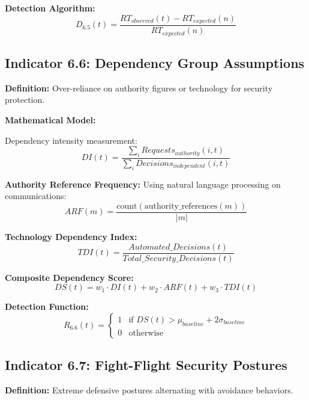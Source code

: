 \documentclass[11pt,a4paper]{article}
\begin{document}
\textbf{Detection Algorithm:}
\begin{equation}
D_{6.5}(t) = \frac{RT_{observed}(t) - RT_{expected}(n)}{RT_{expected}(n)}
\end{equation}

\subsection{Indicator 6.6: Dependency Group Assumptions}

\textbf{Definition:} Over-reliance on authority figures or technology for security protection.

\textbf{Mathematical Model:}

Dependency intensity measurement:
\begin{equation}
DI(t) = \frac{\sum_{i} Requests_{authority}(i,t)}{\sum_{i} Decisions_{independent}(i,t)}
\end{equation}

\textbf{Authority Reference Frequency:}
Using natural language processing on communications:
\begin{equation}
ARF(m) = \frac{\text{count}(\text{authority\_references}(m))}{|m|}
\end{equation}

\textbf{Technology Dependency Index:}
\begin{equation}
TDI(t) = \frac{Automated\_Decisions(t)}{Total\_Security\_Decisions(t)}
\end{equation}

\textbf{Composite Dependency Score:}
\begin{equation}
DS(t) = w_1 \cdot DI(t) + w_2 \cdot ARF(t) + w_3 \cdot TDI(t)
\end{equation}

\textbf{Detection Function:}
\begin{equation}
R_{6.6}(t) = \begin{cases}
1 & \text{if } DS(t) > \mu_{baseline} + 2\sigma_{baseline} \\
0 & \text{otherwise}
\end{cases}
\end{equation}

\subsection{Indicator 6.7: Fight-Flight Security Postures}

\textbf{Definition:} Extreme defensive postures alternating with avoidance behaviors.
\end{document}

